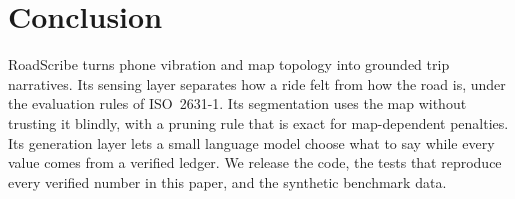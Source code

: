 \section{Conclusion}
\label{sec:conclusion}

RoadScribe turns phone vibration and map topology into grounded trip narratives.
Its sensing layer separates how a ride felt from how the road is, under the evaluation rules of ISO~2631-1.
Its segmentation uses the map without trusting it blindly, with a pruning rule that is exact for map-dependent penalties.
Its generation layer lets a small language model choose what to say while every value comes from a verified ledger.
We release the code, the tests that reproduce every verified number in this paper, and the synthetic benchmark data.
